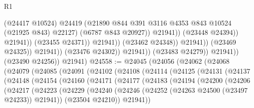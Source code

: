 \begin{lexlean}{R1}
\begin{coremodule}
                                                  (@24417 @10524)
                                                  @24419
                                                  (@21890
                                                    @844
                                                    @391
                                                    @3116
                                                    @4353
                                                    @843
                                                    @10524
                                                    (@21925 @843)
                                                    @22127)
                                                  (@6787 @843 @20927))
                                                @21941))
                                            (@23448 @24394))
                                          @21941))
                                      (@23455 @24371))
                                    @21941))
                                (@23462 @24348))
                              @21941))
                          (@23469 @24325))
                        @21941))
                    (@23476 @24302))
                  @21941))
              (@23483 @24279))
            @21941))
        (@23490 @24256))
      @21941)
@24558 := @24045
    (@24056
      (@24062
        (@24068
          (@24079
            (@24085
              (@24091
                (@24102
                  (@24108
                    (@24114
                      (@24125
                        (@24131
                          (@24137
                            (@24148
                              (@24154
                                (@24160
                                  (@24171
                                    (@24177
                                      (@24183
                                        (@24194
                                          (@24200
                                            (@24206
                                              (@24217
                                                (@24223
                                                  (@24229
                                                    (@24240
                                                      (@24246
                                                        (@24252
                                                          (@24263 @24500 (@23497 @24233))
                                                          @21941))
                                                      (@23504 @24210))
                                                    @21941))

\end{coremodule}
\end{lexlean}
